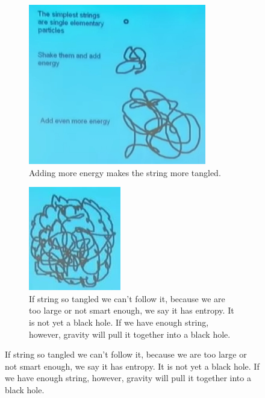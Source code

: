 \documentclass[]{article}
\begin{document}
\begin{figure}[H]
	\caption{String Theory is a theory where elementary particles are tiny pieces of string}
	\begin{subfigure}[b]{0.3\textwidth}
		\caption{Adding more energy makes the string more tangled.}
		\includegraphics[width=\textwidth]{wh-strings}
	\end{subfigure}
	\;
	\begin{subfigure}[b]{0.3\textwidth}
		\caption{If string so tangled we can't follow it, because we are too large or not smart enough, we say it has entropy. It is not yet a black hole. If we have enough string, however, gravity will pull it together into a black hole.}
		\includegraphics[width=\textwidth]{wh-string-tangle}

\end{subfigure}
\end{figure}
\end{document}
